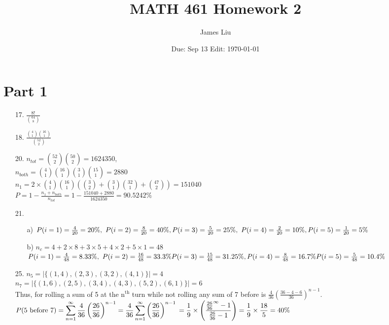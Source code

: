 \documentclass{article}
\date{Due: Sep 13  Edit: \today}
\title{MATH 461 Homework 2}
\author{James Liu}
\begin{document}
\maketitle
\section*{Part 1}
\begin{itemize}
    \item [17.] \(\displaystyle\frac{8!}{\binom{64}{8}}\)
    \item [18.] \(\displaystyle\frac{\binom{4}{1}\binom{16}{1}}{\binom{52}{2}}\)
    \item [20.] \(\displaystyle n_{tot} = \binom{52}{2}\binom{50}{2}=1624350\), \\ 
    \(\displaystyle n_{both} = \binom{4}{1}\binom{16}{1}\binom{3}{1}\binom{15}{1}=2880\)\\
    \(\displaystyle n_{1} = 2\times \binom{4}{1}\binom{16}{1}\left(\binom{3}{2}+\binom{3}{1}\binom{32}{1}+\binom{47}{2}\right)=151040\)\\
    \(\displaystyle P =1 -  \frac{n_1+n_{both}}{n_{tot}} = 1-\frac{151040+2880}{1624350} = 90.5242\%\)
    \item [21.]
    \begin{itemize}
        \item [a)] \(P(i=1) = \frac{4}{20} = 20\%,\ P(i=2)= \frac{8}{20} = 40\%,\\ 
        P(i=3) = \frac{5}{20} = 25\%,\ P(i=4) = \frac{2}{20} = 10\%, \\
        P(i=5) = \frac{1}{20} = 5\%\)
        \item [b)] \(n_{c} = 4+2\times 8 +3\times 5 + 4\times2 + 5\times 1 = 48 \)\\
        \(P(i = 1) = \frac{4}{48}=8.33\%,\ P(i = 2) = \frac{16}{48}=33.3\%\\
        P(i = 3) = \frac{15}{48}=31.25\%, P(i = 4) = \frac{8}{48}=16.7\%\\
        P(i = 5) = \frac{5}{48}=10.4\%\)
    \end{itemize}
    \item [25.] \(n_5 = |\{(1,4),(2,3),(3,2),(4,1)\}| = 4\)\\
                \(n_7 = |\{(1,6),(2,5),(3,4),(4,3),(5,2),(6,1)\}| = 6\)\\
                Thus, for rolling a sum of 5 at the n\(^{\text{th}}\) turn while not rolling any sum of 7 before is \(\displaystyle \frac{4}{36}\left(\frac{36-4-6}{36}\right)^{n-1}\).
                \\ \(\displaystyle P(\text{5 before 7}) = \sum_{n=1}^\infty \frac{4}{36}\left(\frac{26}{36}\right)^{n-1}= \frac{4}{36}\sum_{n=1}^\infty\left(\frac{26}{36}\right)^{n-1} \\= \frac{1}{9}\times\left(\frac{\frac{26}{36}^\infty-1}{\frac{26}{36}-1}\right)=\frac{1}{9}\times \frac{18}{5} =40\%\)

\end{itemize}
\end{document}
